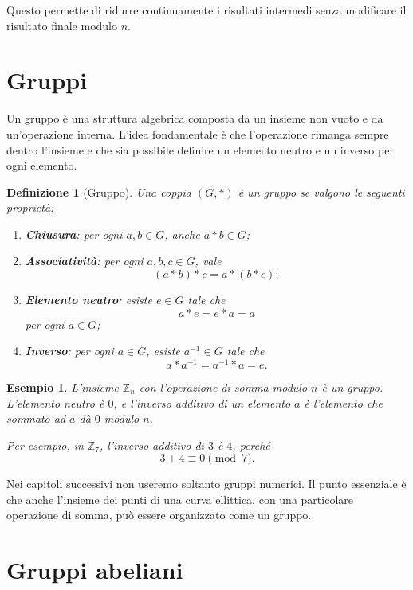 \documentclass[12pt,a4paper,oneside]{report}
\newtheorem{definition}{Definizione}[chapter]
\newtheorem{example}{Esempio}[chapter]
\begin{document}
Questo permette di ridurre continuamente i risultati intermedi senza modificare il risultato finale modulo \(n\).

\section{Gruppi}

Un gruppo è una struttura algebrica composta da un insieme non vuoto e da un'operazione interna. L'idea fondamentale è che l'operazione rimanga sempre dentro l'insieme e che sia possibile definire un elemento neutro e un inverso per ogni elemento.

\begin{definition}[Gruppo]
Una coppia \((G,\ast)\) è un gruppo se valgono le seguenti proprietà:
\begin{enumerate}
    \item \textbf{Chiusura}: per ogni \(a,b \in G\), anche \(a \ast b \in G\);
    \item \textbf{Associatività}: per ogni \(a,b,c \in G\), vale
    \[
    (a \ast b) \ast c = a \ast (b \ast c);
    \]
    \item \textbf{Elemento neutro}: esiste \(e \in G\) tale che
    \[
    a \ast e = e \ast a = a
    \]
    per ogni \(a \in G\);
    \item \textbf{Inverso}: per ogni \(a \in G\), esiste \(a^{-1} \in G\) tale che
    \[
    a \ast a^{-1} = a^{-1} \ast a = e.
    \]
\end{enumerate}
\end{definition}

\begin{example}
L'insieme \(\mathbb{Z}_n\) con l'operazione di somma modulo \(n\) è un gruppo. L'elemento neutro è \(0\), e l'inverso additivo di un elemento \(a\) è l'elemento che sommato ad \(a\) dà \(0\) modulo \(n\).

Per esempio, in \(\mathbb{Z}_7\), l'inverso additivo di \(3\) è \(4\), perché
\[
3+4 \equiv 0 \pmod 7.
\]
\end{example}

Nei capitoli successivi non useremo soltanto gruppi numerici. Il punto essenziale è che anche l'insieme dei punti di una curva ellittica, con una particolare operazione di somma, può essere organizzato come un gruppo.

\section{Gruppi abeliani}
\end{document}
